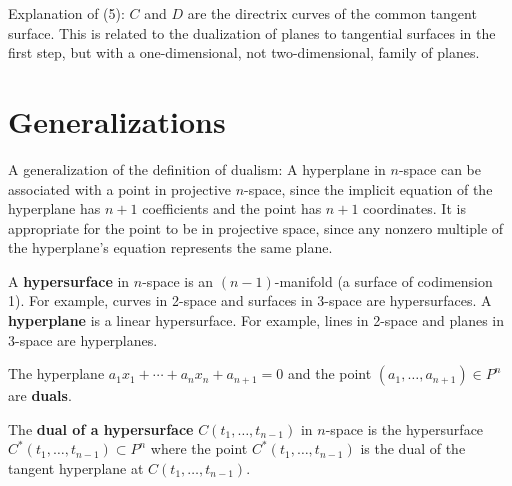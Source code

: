 Explanation of (5):
	$C$ and $D$ are the directrix curves of the common tangent surface.
	This is related to the dualization of planes to tangential surfaces
	in the first step, but with a one-dimensional,
	not two-dimensional, family of planes.
	
\section{Generalizations}

A generalization of the definition of dualism:
A hyperplane in $n$-space can be associated with a point in projective 
$n$-space, since the implicit equation of the hyperplane has $n+1$ coefficients 
and the point has $n+1$ coordinates.
It is appropriate for the point to be in projective space,
since any nonzero multiple of the hyperplane's equation represents the same plane.
%
\begin{defn2}
A {\bf hypersurface} in $n$-space is an $(n-1)$-manifold (a surface of codimension 1).
For example, curves in 2-space and surfaces in 3-space are hypersurfaces.
A {\bf hyperplane} is a linear hypersurface.
For example, lines in 2-space and planes in 3-space are hyperplanes.
\end{defn2}
%
\begin{defn2}
The hyperplane $a_1x_1+\cdots+a_nx_n+a_{n+1}=0$ %
and the point $(a_1,\ldots,a_{n+1}) \in P^n$ are {\bf duals}.
\end{defn2}
%
\begin{defn2}
The {\bf dual of a hypersurface} $C(t_1,\ldots,t_{n-1})$ in $n$-space is the
hypersurface \linebreak $C^*(t_1,\ldots,t_{n-1}) \subset P^n$ where the point 
$C^*(t_1,\ldots,t_{n-1})$ is the dual 
of the tangent hyperplane at $C(t_1,\ldots,t_{n-1})$. 
\end{defn2}



